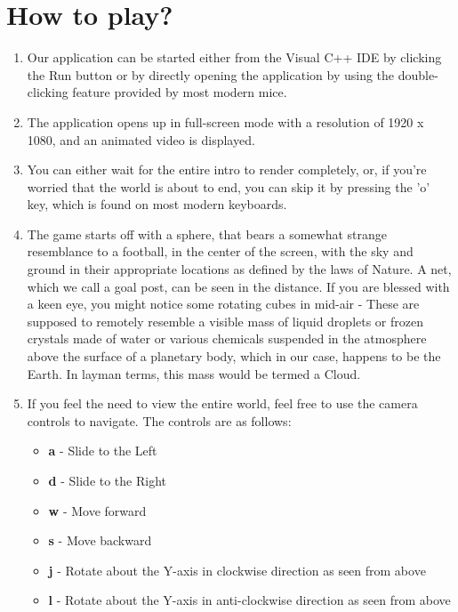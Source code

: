 \documentclass[12pt]{article} %
\begin{document}
\section{How to play?}
\begin{enumerate}
\item{Our application can be started either from the Visual C++ IDE by clicking the Run button or by directly opening the application by using the double-clicking feature provided by most modern mice.}

\item{The application opens up in full-screen mode with a resolution of 1920 x 1080, and an animated video is displayed.}

\item{You can either wait for the entire intro to render completely, or, if you're worried that the world is about to end, you can skip it by pressing the 'o' key, which is found on most modern keyboards.}

\item{The game starts off with a sphere, that bears a somewhat strange resemblance to a football, in the center of the screen, with the sky and ground in their appropriate locations as defined by the laws of Nature. A net, which we call a goal post, can be seen in the distance. If you are blessed with a keen eye, you might notice some rotating cubes in mid-air - These are supposed to remotely resemble a visible mass of liquid droplets or frozen crystals made of water or various chemicals suspended in the atmosphere above the surface of a planetary body, which in our case, happens to be the Earth. In layman terms, this mass would be termed a Cloud.}

\item{If you feel the need to view the entire world, feel free to use the camera controls to navigate. The controls are as follows:}
\begin{itemize}
\item{\textbf{a} - Slide to the Left}
\item{\textbf{d} - Slide to the Right}
\item{\textbf{w} - Move forward}
\item{\textbf{s} - Move backward}
\item{\textbf{j} - Rotate about the Y-axis in clockwise direction as seen from above}
\item{\textbf{l} - Rotate about the Y-axis in anti-clockwise direction as seen from above}
\end{itemize}


\end{enumerate}
\end{document}
